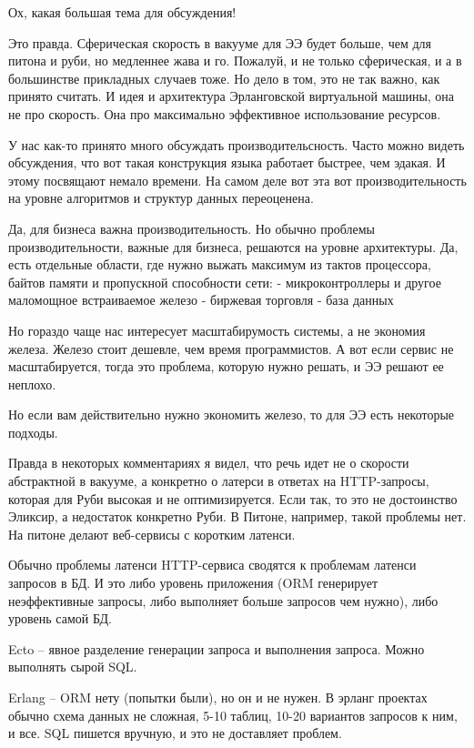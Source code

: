 \documentclass[10pt]{beamer}
\begin{document}
Ох, какая большая тема для обсуждения!

Это правда. Сферическая скорость в вакууме для ЭЭ будет больше, чем для питона и руби, но медленнее жава и го.
Пожалуй, и не только сферическая, и а в большинстве прикладных случаев тоже.
Но дело в том, это не так важно, как принято считать.
И идея и архитектура Эрланговской виртуальной машины, она не про скорость. Она про максимально эффективное использование ресурсов.

У нас как-то принято много обсуждать производительсность.
Часто можно видеть обсуждения, что вот такая конструкция языка работает быстрее, чем эдакая. И этому посвящают немало времени.
На самом деле вот эта вот производительность на уровне алгоритмов и структур данных переоценена.

Да, для бизнеса важна производительность. Но обычно проблемы производительности, важные для бизнеса, решаются на уровне архитектуры.
Да, есть отдельные области, где нужно выжать максимум из тактов процессора, байтов памяти и пропускной способности сети:
- микроконтроллеры и другое маломощное встраиваемое железо
- биржевая торговля
- база данных

Но гораздо чаще нас интересует масштабирумость системы, а не экономия железа.
Железо стоит дешевле, чем время программистов. А вот если сервис не масштабируется, тогда это проблема, которую нужно решать, и ЭЭ решают ее неплохо.

Но если вам действительно нужно экономить железо, то для ЭЭ есть некоторые подходы.

Правда в некоторых комментариях я видел, что речь идет не о скорости абстрактной в вакууме,
а конкретно о латерси в ответах на HTTP-запросы, которая для Руби высокая и не оптимизируется.
Если так, то это не достоинство Эликсир, а недостаток конкретно Руби.
В Питоне, например, такой проблемы нет. На питоне делают веб-сервисы с коротким латенси.

Обычно проблемы латенси HTTP-сервиса сводятся к проблемам латенси запросов в БД.
И это либо уровень приложения (ORM генерирует неэффективные запросы, либо выполняет больше запросов чем нужно),
либо уровень самой БД.

Ecto -- явное разделение генерации запроса и выполнения запроса. Можно выполнять сырой SQL.

Erlang -- ORM нету (попытки были), но он и не нужен.
В эрланг проектах обычно схема данных не сложная, 5-10 таблиц, 10-20 вариантов запросов к ним, и все.
SQL пишется вручную, и это не доставляет проблем.
\end{document}
